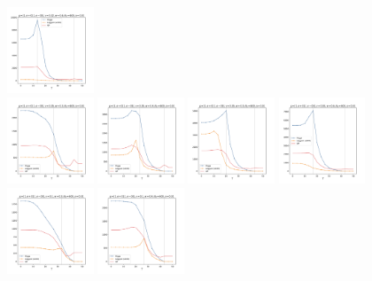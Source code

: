 \documentclass[a4paper]{article}
\begin{document}
\begin{figure}[H]
  \includegraphics[width=0.23\textwidth]{grid-v2-w4_0}
  \\
  \includegraphics[width=0.23\textwidth]{grid-v3-w1_0}
  \includegraphics[width=0.23\textwidth]{grid-v3-w2_0}
  \includegraphics[width=0.23\textwidth]{grid-v3-w3_0}
  \includegraphics[width=0.23\textwidth]{grid-v3-w4_0}
  \\
  \includegraphics[width=0.23\textwidth]{grid-v4-w1_0}
  \includegraphics[width=0.23\textwidth]{grid-v4-w2_0}

\end{figure}
\end{document}
